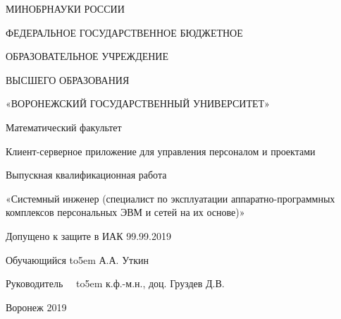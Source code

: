 \documentclass[14pt,a4paper,openbib]{extarticle}
\numberwithin{equation}{section}
\begin{document}
\begin{titlepage}
\begin{center}
МИНОБРНАУКИ РОССИИ

ФЕДЕРАЛЬНОЕ ГОСУДАРСТВЕННОЕ БЮДЖЕТНОЕ

ОБРАЗОВАТЕЛЬНОЕ УЧРЕЖДЕНИЕ

ВЫСШЕГО ОБРАЗОВАНИЯ

«ВОРОНЕЖСКИЙ ГОСУДАРСТВЕННЫЙ УНИВЕРСИТЕТ»

\begin{spacing}{4}
\end{spacing}

Математический факультет
\begin{spacing}{5.5}
\end{spacing}


Клиент-серверное приложение для управления персоналом и проектами
\begin{spacing}{4.5}
\end{spacing}


Выпускная квалификационная работа 

«Системный инженер (специалист по эксплуатации аппаратно-программных комплексов персональных ЭВМ и сетей на их основе)»

   \end{center}

   \begin{spacing}{5.5}
\end{spacing}

Допущено к защите в ИАК	 99.99.2019

\begin{spacing}{2}
\end{spacing}

\begin{spacing}{2}
\end{spacing}
Обучающийся \def\hrf#1{\hbox to#1{\hrulefill}}
\hrf{5em} А.А. Уткин
\begin{spacing}{2}
\end{spacing}
Руководитель\ \ \def\hrf#1{\hbox to#1{\hrulefill}}
\hrf{5em}
		 к.ф.-м.н., доц.	Груздев Д.В.

\begin{center}
\begin{spacing}{4}
\end{spacing}
Воронеж 2019
   \end{center}

\end{titlepage}
\renewcommand\contentsname{Оглавление} %
\tableofcontents
\setcounter{page}{2}
\end{document}
